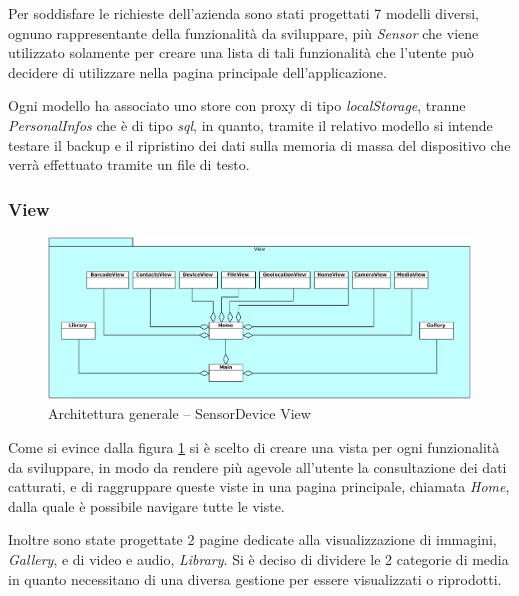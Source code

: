 Per soddisfare le richieste dell'azienda sono stati progettati 7 modelli diversi, ognuno rappresentante della funzionalità da sviluppare, più \emph{Sensor} che viene utilizzato solamente per creare una lista di tali funzionalità che l'utente può decidere di utilizzare nella pagina principale dell'applicazione.

Ogni modello ha associato uno store con proxy di tipo \emph{localStorage}, tranne \emph{PersonalInfos} che è di tipo \emph{sql}, in quanto, tramite il relativo modello si intende testare il backup e il ripristino dei dati sulla memoria di massa del dispositivo che verrà effettuato tramite un file di testo.

\subsubsection{View}
\begin{figure}[htb]
\centering
\includegraphics[scale=0.45]{gfx/class/SensorDevice_View.pdf}
\caption{Architettura generale -- SensorDevice View}
\label{fig:architettura SensorDevice View}
\end{figure}
Come si evince dalla figura \ref{fig:architettura SensorDevice View} si è scelto di creare una vista per ogni funzionalità da sviluppare, in modo da rendere più agevole all'utente la consultazione dei dati catturati, e di raggruppare queste viste in una pagina principale, chiamata \emph{Home}, dalla quale è possibile navigare tutte le viste.

Inoltre sono state progettate 2 pagine dedicate alla visualizzazione di immagini, \emph{Gallery}, e di video e audio, \emph{Library}.
Si è deciso di dividere le 2 categorie di media in quanto necessitano di una diversa gestione per essere visualizzati o riprodotti.

